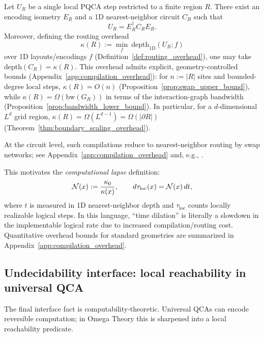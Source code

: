 \begin{proposition}
\label{prop:1d_compilation}
Let $U_R$ be a single local PQCA step restricted to a finite region $R$. There exist an encoding isometry $E_R$ and a 1D nearest-neighbor circuit $C_R$ such that
\begin{equation}
U_R = E_R^{\dagger} C_R E_R.
\end{equation}
Moreover, defining the routing overhead
\begin{equation}
\kappa(R):=\min_f\ \mathrm{depth}_{\mathrm{1D}}(U_R;f)
\end{equation}
over 1D layouts/encodings $f$ (Definition~\ref{def:routing_overhead}), one may take $\mathrm{depth}(C_R)=\kappa(R)$.
This overhead admits explicit, geometry-controlled bounds (Appendix~\ref{app:compilation_overhead}):
for $n:=|R|$ sites and bounded-degree local steps, $\kappa(R)=O(n)$ (Proposition~\ref{prop:swap_upper_bound}), while $\kappa(R)=\Omega(\mathrm{bw}(G_R))$ in terms of the interaction-graph bandwidth (Proposition~\ref{prop:bandwidth_lower_bound}).
In particular, for a $d$-dimensional $L^d$ grid region, $\kappa(R)=\Omega(L^{d-1})=\Omega(|\partial R|)$ (Theorem~\ref{thm:boundary_scaling_overhead}).
\end{proposition}

At the circuit level, such compilations reduce to nearest-neighbor routing by swap networks; see Appendix~\ref{app:compilation_overhead} and, e.g., \cite{Kutin2007}.

This motivates the \emph{computational lapse} definition:
\begin{equation}
\mathcal{N}(x):=\frac{\kappa_0}{\kappa(x)},\qquad d\tau_{\mathrm{loc}}(x)=\mathcal{N}(x)\,dt,
\label{eq:lapse_definition}
\end{equation}
where $t$ is measured in 1D nearest-neighbor depth and $\tau_{\mathrm{loc}}$ counts locally realizable logical steps.
In this language, ``time dilation'' is literally a slowdown in the implementable logical rate due to increased compilation/routing cost.
Quantitative overhead bounds for standard geometries are summarized in Appendix~\ref{app:compilation_overhead}.

\subsection{Undecidability interface: local reachability in universal QCA}
\label{subsec:undecidability_interface}
The final interface fact is computability-theoretic. Universal QCAs can encode reversible computation; in Omega Theory this is sharpened into a local reachability predicate.

